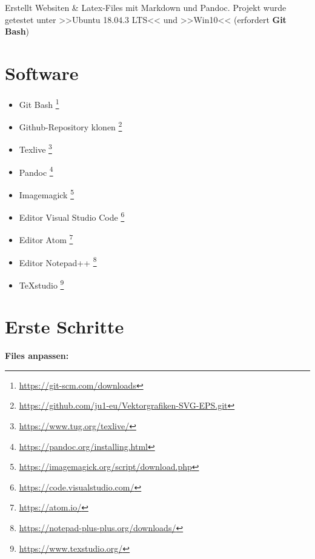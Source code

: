 Erstellt Websiten \& Latex-Files mit Markdown und Pandoc. Projekt wurde
getestet unter >>Ubuntu 18.04.3 LTS<< und >>Win10<< (erfordert
\textbf{Git Bash})

\section{Software}\label{software}

\begin{itemize}
\item
  Git Bash \footnote{\url{https://git-scm.com/downloads}}
\item
  Github-Repository klonen \footnote{\url{https://github.com/ju1-eu/Vektorgrafiken-SVG-EPS.git}}
\item
  Texlive \footnote{\url{https://www.tug.org/texlive/}}
\item
  Pandoc \footnote{\url{https://pandoc.org/installing.html}}
\item
  Imagemagick \footnote{\url{https://imagemagick.org/script/download.php}}
\item
  Editor Visual Studio Code \footnote{\url{https://code.visualstudio.com/}}
\item
  Editor Atom \footnote{\url{https://atom.io/}}
\item
  Editor Notepad++ \footnote{\url{https://notepad-plus-plus.org/downloads/}}
\item
  TeXstudio \footnote{\url{https://www.texstudio.org/}}
\end{itemize}

\section{Erste Schritte}\label{erste-schritte}

\textbf{Files anpassen:}

